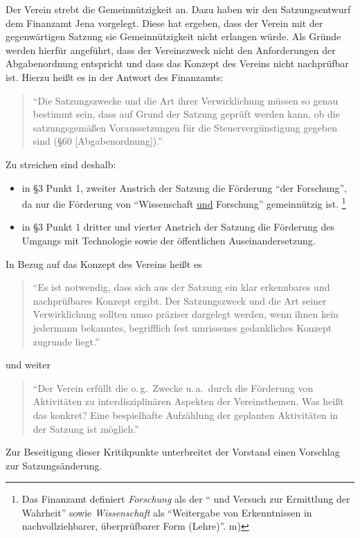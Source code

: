 \documentclass[10pt,DIV16]{scrartcl}
\begin{document}
Der Verein strebt die Gemeinnützigkeit an.  Dazu haben wir den Satzungsentwurf
dem Finanzamt Jena vorgelegt.  Diese hat ergeben, dass der Verein mit der
gegenwärtigen Satzung sie Gemeinnützigkeit nicht erlangen würde.  Als Gründe
werden hierfür angeführt, dass der Vereinszweck nicht den Anforderungen der
Abgabenordnung entspricht und dass das Konzept des Vereins nicht nachprüfbar
ist.  Hierzu heißt es in der Antwort des Finanzamts:
\begin{quote}
	"`Die Satzungszwecke und die Art ihrer Verwirklichung müssen so genau
	bestimmt sein, dass auf Grund der Satzung geprüft werden kann, ob die
	satzungsgemäßen Voraussetzungen für die Steuervergünstigung gegeben sind
	(§60 [Abgabenordnung])."'
\end{quote}
Zu streichen sind deshalb:
\begin{itemize}
	\item
		in §3 Punkt 1, zweiter Anstrich der Satzung die Förderung "`der
		Forschung"', da nur die Förderung von "`Wissenschaft \underline{und}
		Forschung"' gemeinnützig ist.
		\footnote{
			Das Finanzamt definiert \emph{Forschung} als der
			"`\underline{} und
			\underline{} Versuch zur Ermittlung der
			Wahrheit"' sowie \emph{Wissenschaft} als "`Weitergabe von
			Erkenntnissen in nachvollziehbarer, überprüfbarer Form (Lehre)"'.
			\quad m)
		}
	\item
		in §3 Punkt 1 dritter und vierter Anstrich der Satzung die Förderung
		des Umgangs mit Technologie sowie der öffentlichen Auseinandersetzung.
\end{itemize}
In Bezug auf das Konzept des Vereins heißt es
\begin{quote}
	"`Es ist notwendig, dass sich aus der Satzung ein klar erkennbares und
	nachprüfbares Konzept ergibt.  Der Satzungszweck und die Art seiner
	Verwirklichung sollten umso präziser dargelegt werden, wenn ihnen kein
	jedermann bekanntes, begrifflich fest umrissenes gedankliches Konzept
	zugrunde liegt."'
\end{quote}
und weiter
\begin{quote}
	"`Der Verein erfüllt die o.\,g.\ Zwecke u.\,a.\ durch \glq die Förderung von
	Aktivitäten zu interdisziplinären Aspekten der Vereinsthemen\grq.  Was heißt
	das konkret?  Eine bespielhafte Aufzählung der geplanten Aktivitäten in
	der Satzung ist möglich."'
\end{quote}
Zur Beseitigung dieser Kritikpunkte unterbreitet der Vorstand einen Vorschlag
zur Satzungsänderung.
\end{document}
